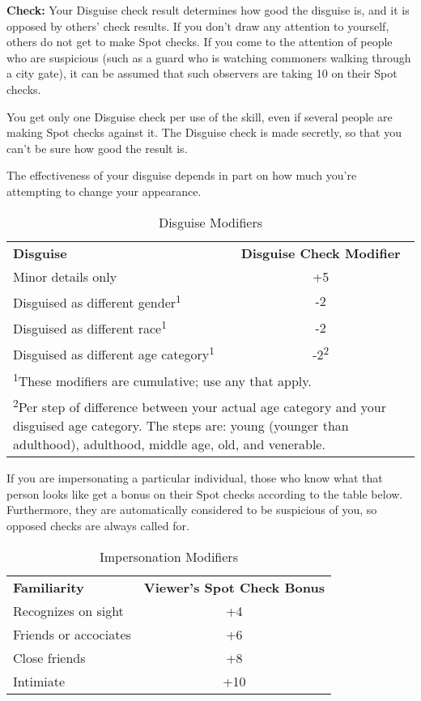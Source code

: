
\textbf{Check:} Your Disguise check result determines how good the disguise is, 
and it is opposed by others'  check results. If you don't draw any attention 
to yourself, others do not get to make Spot checks. If you come to the attention 
of people who are suspicious (such as a guard who is watching commoners walking 
through a city gate), it can be assumed that such observers are taking 10 on their 
Spot checks.

You get only one Disguise check per use of the skill, even if several people are 
making Spot checks against it. The Disguise check is made secretly, so that you 
can't be sure how good the result is.

The effectiveness of your disguise depends in part on how much you're attempting 
to change your appearance.

\begin{table}[htb]
\caption{Disguise Modifiers}
\centering
\begin{tabular}{l c}
\textbf{Disguise} & \textbf{Disguise Check Modifier} \\
Minor details only & +5\\
Disguised as different gender\textsuperscript{1} & -2\\
Disguised as different race\textsuperscript{1} & -2\\
Disguised as different age category\textsuperscript{1} & -2\textsuperscript{2}\\
\multicolumn{2}{l}{\textsuperscript{1}These modifiers are cumulative; use any that apply.}\\
\multicolumn{2}{p{9cm}}{\textsuperscript{2}Per step of difference between your actual age category and your disguised age category. The steps are: young (younger than adulthood), adulthood, middle age, old, and venerable.}\\
\end{tabular}
\end{table}

If you are impersonating a particular individual, those who know what that person 
looks like get a bonus on their Spot checks according to the table below. Furthermore, 
they are automatically considered to be suspicious of you, so opposed checks are 
always called for.

\begin{table}[htb]
\caption{Impersonation Modifiers}
\centering
\begin{tabular}{l c}
\textbf{Familiarity} & \textbf{Viewer's Spot Check Bonus}\\
Recognizes on sight & +4\\
Friends or accociates & +6\\
Close friends & +8\\
Intimiate & +10\\
\end{tabular}
\end{table}

